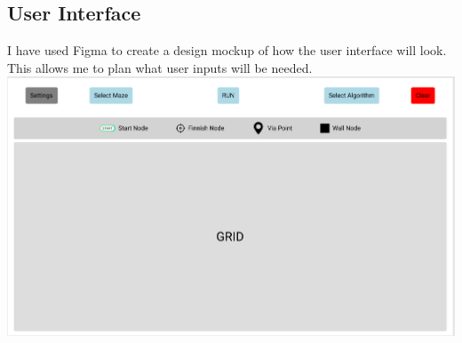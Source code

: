 \documentclass{article}
\begin{document}
\subsection{User Interface}
I have used Figma to create a design mockup of how the user interface will look. This allows me to plan what user inputs will be needed.
\newline
\includegraphics[width=\linewidth]{assets/gui.PNG}
\end{document}
